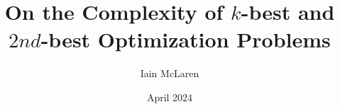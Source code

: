 \documentclass[11pt, final]{westhesis}
\title{On the Complexity of $k$-best and $2nd$-best Optimization Problems}
\author{Iain McLaren}
\date{April 2024}
\begin{document}





\frontmatter
\maketitle
\makededication
\makeack
\makeabstract
\tableofcontents

\mainmatter














\printindex


\appendix


\backmatter
\end{document}

